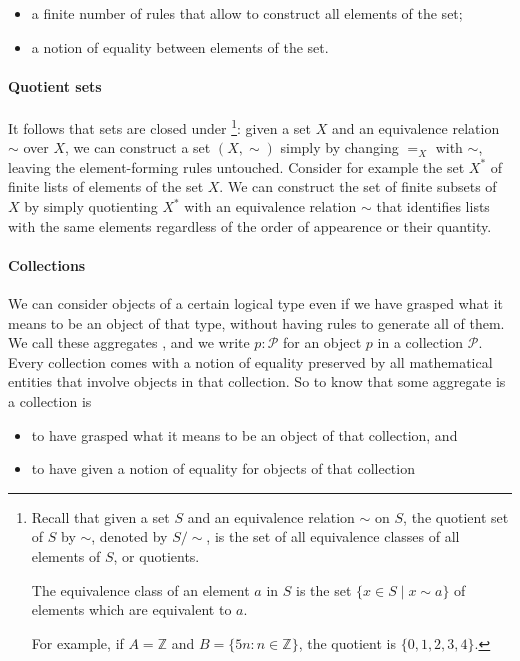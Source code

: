 \begin{itemize}
\item a finite number of rules that allow to construct all elements of the set;
\item a notion of equality between elements of the set.
\end{itemize}

\paragraph{Quotient sets}

It follows that sets are closed under \footnote{
  Recall that given a set $S$ and an equivalence relation $\sim$ on
  $S$, the quotient set of $S$ by $\sim$, denoted by $S / \sim$, is
  the set of all equivalence classes of all elements of $S$, or
  quotients.

  The equivalence class of an element $a$ in $S$ is the set
  $ \{x\in S\mid x\sim a\}$ of elements which are equivalent to $a$.  

  For example, if $A=\mathbb{Z}$ and $B=\{5n : n \in \mathbb{Z}\}$,
  the quotient is $\{0,1,2,3,4\}$.}:
given a set $X$ and an equivalence relation $\sim$ over $X$, we can
construct a set $(X,\sim)$ simply by changing $=_X$ with $\sim$,
leaving the element-forming rules untouched.
Consider for example the set $X^*$ of finite lists of elements of the set
$X$. We can construct the set of finite subsets of $X$ by simply quotienting
$X^*$ with an equivalence relation $\sim$ that identifies lists with the same
elements regardless of the order of appearence or their quantity.

\paragraph{Collections}

We can consider objects of a certain logical type even if we have grasped what
it means to be an object of that type, without having rules to generate all of
them. We call these aggregates , and we write $p :
\mathcal{P}$ for an object $p$ in a collection $\mathcal{P}$. Every collection
comes with a notion of equality preserved by all mathematical entities that
involve objects in that collection. So to know that some aggregate is a
collection is

\begin{itemize}
\item to have grasped what it means to be an object of that collection, and
\item to have given a notion of equality for objects of that collection
\end{itemize}

